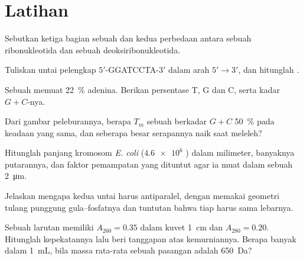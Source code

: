 \section{Latihan}

\begin{exercise}[$\star$]\label{exo:b1:nucleic-acids:1}
Sebutkan ketiga bagian sebuah  dan kedua perbedaan antara
sebuah ribonukleotida dan sebuah deoksiribonukleotida.
\end{exercise}

\begin{exercise}[$\star$]\label{exo:b1:nucleic-acids:2}
Tuliskan untai pelengkap $5'$-GGATCCTA-$3'$ dalam arah $5' \to 3'$, dan
hitunglah .
\end{exercise}

\begin{exercise}[$\star$]\label{exo:b1:nucleic-acids:3}
Sebuah  memuat \qty{22}{\%} adenina. Berikan persentase T, G dan C,
serta kadar $G + C$-nya.
\end{exercise}

\begin{exercise}[$\star$]\label{exo:b1:nucleic-acids:4}
Dari gambar peleburannya, berapa $T_m$ sebuah  berkadar $G + C$
\qty{50}{\%} pada keadaan yang sama, dan seberapa besar serapannya naik
saat meleleh?
\end{exercise}

\begin{exercise}[$\star\star$]\label{exo:b1:nucleic-acids:5}
Hitunglah panjang kromosom \emph{E. coli} ($\num{4.6e6}$ )
dalam milimeter, banyaknya putarannya, dan faktor pemampatan yang
dituntut agar ia muat dalam sebuah  \qty{2}{\micro m}.
\end{exercise}

\begin{exercise}[$\star\star$]\label{exo:b1:nucleic-acids:6}
Jelaskan mengapa kedua untai  harus antiparalel, dengan memakai
geometri tulang punggung gula--fosfatnya dan tuntutan bahwa tiap
 harus sama lebarnya.
\end{exercise}

\begin{exercise}[$\star\star$]\label{exo:b1:nucleic-acids:7}
Sebuah larutan  memiliki $A_{260} = 0.35$ dalam kuvet \qty{1}{cm}
dan $A_{280} = 0.20$. Hitunglah kepekatannya lalu beri tanggapan atas
kemurniannya. Berapa banyak  dalam \qty{1}{mL}, bila massa
rata-rata sebuah pasangan adalah
\qty{650}{Da}?
\end{exercise}

